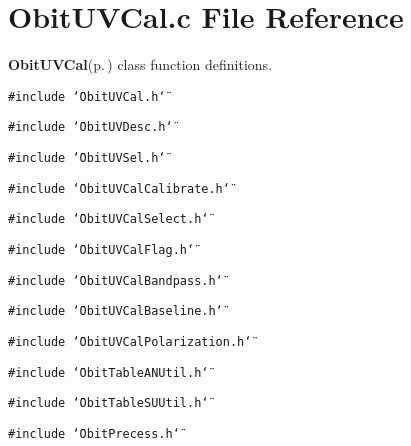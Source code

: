 \section{Obit\-UVCal.c File Reference}
\label{ObitUVCal_8c}
{\bf Obit\-UVCal}{\rm (p.\,\pageref{structObitUVCal})} class function definitions. 

{\tt \#include \char`\"{}Obit\-UVCal.h\char`\"{}}\par
{\tt \#include \char`\"{}Obit\-UVDesc.h\char`\"{}}\par
{\tt \#include \char`\"{}Obit\-UVSel.h\char`\"{}}\par
{\tt \#include \char`\"{}Obit\-UVCal\-Calibrate.h\char`\"{}}\par
{\tt \#include \char`\"{}Obit\-UVCal\-Select.h\char`\"{}}\par
{\tt \#include \char`\"{}Obit\-UVCal\-Flag.h\char`\"{}}\par
{\tt \#include \char`\"{}Obit\-UVCal\-Bandpass.h\char`\"{}}\par
{\tt \#include \char`\"{}Obit\-UVCal\-Baseline.h\char`\"{}}\par
{\tt \#include \char`\"{}Obit\-UVCal\-Polarization.h\char`\"{}}\par
{\tt \#include \char`\"{}Obit\-Table\-ANUtil.h\char`\"{}}\par
{\tt \#include \char`\"{}Obit\-Table\-SUUtil.h\char`\"{}}\par
{\tt \#include \char`\"{}Obit\-Precess.h\char`\"{}}\par
